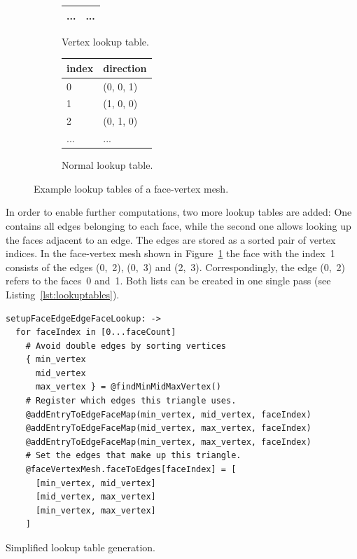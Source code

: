 \documentclass[../ClassicThesis.tex]{subfiles}
\begin{document}
\begin{figure}
\begin{subfigure}[t]{0.32\textwidth}
\begin{tabular}{ | l | l | }
      ... & ... \\
      \hline
    \end{tabular}
    \caption{Vertex lookup table.}
  \end{subfigure}
  \begin{subfigure}[t]{0.32\textwidth}
    \centering
    \begin{tabular}{ | l | l | }
      \hline
      index & direction \\ \hline
      0 & (0, 0, 1) \\ \hline
      1 & (1, 0, 0) \\ \hline
      2 & (0, 1, 0) \\ \hline
      ... & ... \\
      \hline
    \end{tabular}
    \caption{Normal lookup table.}
  \end{subfigure}
  \caption{Example lookup tables of a face-vertex mesh.}
  \label{fig:facevertexmesh}
\end{figure}

In order to enable further computations, two more lookup tables are added: One contains all edges belonging to each face, while the second one allows looking up the faces adjacent to an edge. The edges are stored as a sorted pair of vertex indices. In the face-vertex mesh shown in Figure~\ref{fig:facevertexmesh} the face with the index~1 consists of the edges (0,~2), (0,~3) and (2,~3). Correspondingly, the edge (0,~2) refers to the faces~0 and~1. Both lists can be created in one single pass (see Listing~\ref{lst:lookuptables}).

\begin{listing}
\begin{verbatim}
setupFaceEdgeEdgeFaceLookup: ->
  for faceIndex in [0...faceCount]
    # Avoid double edges by sorting vertices
    { min_vertex
      mid_vertex
      max_vertex } = @findMinMidMaxVertex()
    # Register which edges this triangle uses.
    @addEntryToEdgeFaceMap(min_vertex, mid_vertex, faceIndex)
    @addEntryToEdgeFaceMap(mid_vertex, max_vertex, faceIndex)
    @addEntryToEdgeFaceMap(min_vertex, max_vertex, faceIndex)
    # Set the edges that make up this triangle.
    @faceVertexMesh.faceToEdges[faceIndex] = [
      [min_vertex, mid_vertex]
      [mid_vertex, max_vertex]
      [min_vertex, max_vertex]
    ]
\end{verbatim}
\caption{Simplified lookup table generation.}
\label{lst:lookuptables}
\end{listing}
\end{document}
